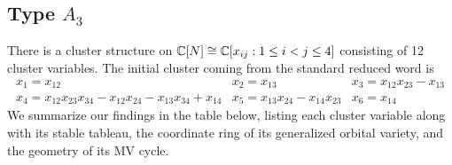 \documentclass{article}
\begin{document}
\subsection{Type \texorpdfstring{$A_3$}{A3}}
\label{ss:GL4 examples}
% 
There is a cluster structure on $\mathbb C[N] \cong \mathbb C[x_{ij} : 1 \leq i < j \leq 4]$ consisting of 12 cluster variables. The initial cluster coming from the standard reduced word is
\[
\begin{array}{ccc}
    x_1 = x_{12} & x_2 = x_{13} & x_3 = x_{12}x_{23}-x_{13} \\
    x_4 = x_{12}x_{23}x_{34} - x_{12}x_{24} - x_{13}x_{34} + x_{14} & x_5 = x_{13}x_{24}-x_{14}x_{23} & x_6 = x_{14} 
\end{array}
\]
We summarize our findings in the table below, listing each cluster variable along with its stable tableau, the coordinate ring of its generalized orbital variety, and the geometry of its MV cycle.  
% 
\end{document}
